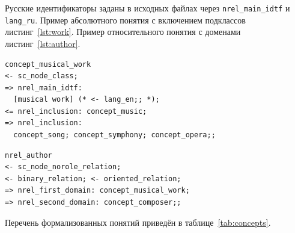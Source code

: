 Русские идентификаторы заданы в исходных файлах через \texttt{nrel\_main\_idtf} и \texttt{lang\_ru}. Пример абсолютного понятия с включением подклассов \mdash листинг~\ref{lst:work}. Пример относительного понятия с доменами \mdash листинг~\ref{lst:author}.

\begin{lstlisting}[caption={Понятие musical work},label={lst:work}]
concept_musical_work
<- sc_node_class;
=> nrel_main_idtf:
  [musical work] (* <- lang_en;; *);
<= nrel_inclusion: concept_music;
=> nrel_inclusion:
  concept_song; concept_symphony; concept_opera;;
\end{lstlisting}

\begin{lstlisting}[caption={Отношение author*},label={lst:author}]
nrel_author
<- sc_node_norole_relation;
<- binary_relation; <- oriented_relation;
=> nrel_first_domain: concept_musical_work;
=> nrel_second_domain: concept_composer;;
\end{lstlisting}

Перечень формализованных понятий приведён в таблице~\ref{tab:concepts}.


